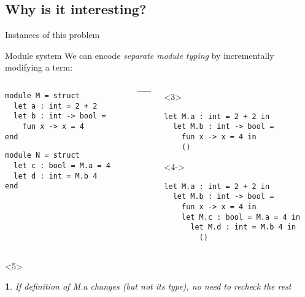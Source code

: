 \documentclass{beamer}
\theoremstyle{example}
\newtheorem{remark}[theorem]{\translate{Remark}}
\begin{document}
\subsection{Why is it interesting?}

\begin{frame}[fragile]{Instances of this problem}
  \begin{block}{Module system}
    We can encode \emph{separate module typing} by incrementally
    modifying a term:

    \begin{overlayarea}{\textwidth}{13em}
    \small
    \begin{columns}
      \begin{column}{0.4\textwidth}
        \begin{lstlisting}
module M = struct
  let a : int = 2 + 2
  let b : int -> bool =
    fun x -> x = 4
end
        \end{lstlisting}
\pause
        \begin{lstlisting}
module N = struct
  let c : bool = M.a = 4
  let d : int = M.b 4
end
        \end{lstlisting}
      \end{column}
      \begin{column}{1mm}
        \rule{.1mm}{4cm}
      \end{column}
\pause
      \begin{column}{0.5\textwidth}
        \begin{onlyenv}<3>
        \begin{lstlisting}
let M.a : int = 2 + 2 in
  let M.b : int -> bool =
    fun x -> x = 4 in
    ()
        \end{lstlisting}
        \vspace{2.4em}
        \end{onlyenv}
        \begin{onlyenv}<4->
        \begin{lstlisting}
let M.a : int = 2 + 2 in
  let M.b : int -> bool =
    fun x -> x = 4 in
    let M.c : bool = M.a = 4 in
      let M.d : int = M.b 4 in
        ()
        \end{lstlisting}
        \end{onlyenv}
      \end{column}
    \end{columns}
    \end{overlayarea}
    \begin{visibleenv}<5>
      \begin{remark}
        If definition of \textsf{M.a} changes {\footnotesize (but not its type)}, no need to recheck the rest
      \end{remark}
    \end{visibleenv}
  \end{block}
\end{frame}
\end{document}
